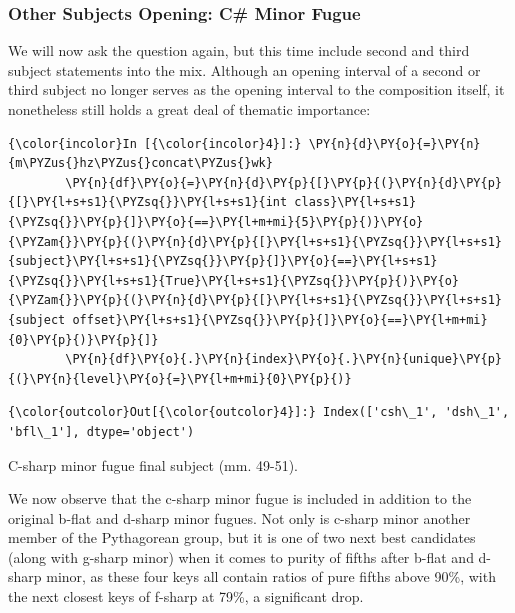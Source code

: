 \subsubsection{Other Subjects Opening: C\# Minor
Fugue}\label{other-subjects-opening-c-minor-fugue}

We will now ask the question again, but this time include second and
third subject statements into the mix. Although an opening interval of a
second or third subject no longer serves as the opening interval to the
composition itself, it nonetheless still holds a great deal of thematic
importance:

    \begin{Verbatim}[commandchars=\\\{\}]
{\color{incolor}In [{\color{incolor}4}]:} \PY{n}{d}\PY{o}{=}\PY{n}{m\PYZus{}hz\PYZus{}concat\PYZus{}wk}
        \PY{n}{df}\PY{o}{=}\PY{n}{d}\PY{p}{[}\PY{p}{(}\PY{n}{d}\PY{p}{[}\PY{l+s+s1}{\PYZsq{}}\PY{l+s+s1}{int class}\PY{l+s+s1}{\PYZsq{}}\PY{p}{]}\PY{o}{==}\PY{l+m+mi}{5}\PY{p}{)}\PY{o}{\PYZam{}}\PY{p}{(}\PY{n}{d}\PY{p}{[}\PY{l+s+s1}{\PYZsq{}}\PY{l+s+s1}{subject}\PY{l+s+s1}{\PYZsq{}}\PY{p}{]}\PY{o}{==}\PY{l+s+s1}{\PYZsq{}}\PY{l+s+s1}{True}\PY{l+s+s1}{\PYZsq{}}\PY{p}{)}\PY{o}{\PYZam{}}\PY{p}{(}\PY{n}{d}\PY{p}{[}\PY{l+s+s1}{\PYZsq{}}\PY{l+s+s1}{subject offset}\PY{l+s+s1}{\PYZsq{}}\PY{p}{]}\PY{o}{==}\PY{l+m+mi}{0}\PY{p}{)}\PY{p}{]}
        \PY{n}{df}\PY{o}{.}\PY{n}{index}\PY{o}{.}\PY{n}{unique}\PY{p}{(}\PY{n}{level}\PY{o}{=}\PY{l+m+mi}{0}\PY{p}{)}
\end{Verbatim}
\begin{Verbatim}[commandchars=\\\{\}]
{\color{outcolor}Out[{\color{outcolor}4}]:} Index(['csh\_1', 'dsh\_1', 'bfl\_1'], dtype='object')
\end{Verbatim}


\begin{Example}[H]
    \begin{center}
    \caption{ C-sharp minor fugue final subject (mm. 49-51). }
    \end{center}
\end{Example}
    
    We now observe that the c-sharp minor fugue is included in addition to
the original b-flat and d-sharp minor fugues. Not only is c-sharp minor
another member of the Pythagorean group, but it is one of two next best
candidates (along with g-sharp minor) when it comes to purity of fifths
after b-flat and d-sharp minor, as these four keys all contain ratios of
pure fifths above 90\%, with the next closest keys of f-sharp at 79\%, a
significant drop.

